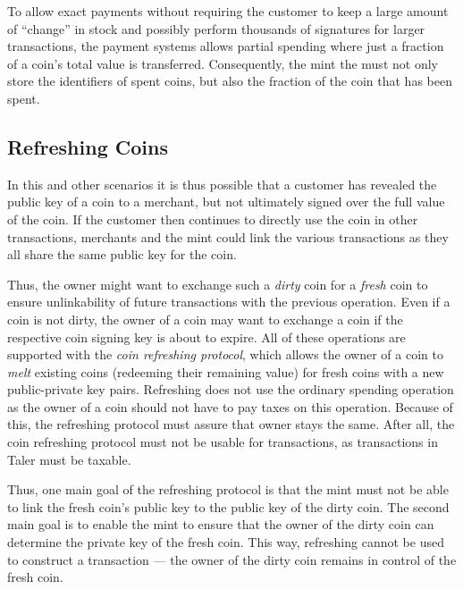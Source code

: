 \documentclass{llncs}
\begin{document}
To allow exact payments without requiring the customer to keep a large
amount of ``change'' in stock and possibly perform thousands of
signatures for larger transactions, the payment systems allows partial
spending where just a fraction of a coin's total value is transferred.
Consequently, the mint the must not only store the identifiers of
spent coins, but also the fraction of the coin that has been spent.


\subsection{Refreshing Coins}

In this and other scenarios it is thus possible that a customer has
revealed the public key of a coin to a merchant, but not ultimately
signed over the full value of the coin.  If the customer then
continues to directly use the coin in other transactions, merchants
and the mint could link the various transactions as they all share the
same public key for the coin.

Thus, the owner might want to exchange such a {\em dirty} coin for a
{\em fresh} coin to ensure unlinkability of future transactions with
the previous operation.  Even if a coin is not dirty, the owner of a
coin may want to exchange a coin if the respective coin signing key is
about to expire.  All of these operations are supported with the {\em
  coin refreshing protocol}, which allows the owner of a coin to {\em
  melt} existing coins (redeeming their remaining value) for fresh
coins with a new public-private key pairs.  Refreshing does not use
the ordinary spending operation as the owner of a coin should not have
to pay taxes on this operation.  Because of this, the refreshing
protocol must assure that owner stays the same.  After all, the coin
refreshing protocol must not be usable for transactions, as
transactions in Taler must be taxable.

Thus, one main goal of the refreshing protocol is that the mint must
not be able to link the fresh coin's public key to the public key of
the dirty coin.  The second main goal is to enable the mint to ensure
that the owner of the dirty coin can determine the private key of the
fresh coin.  This way, refreshing cannot be used to construct a
transaction --- the owner of the dirty coin remains in control of the
fresh coin.

%
\end{document}
